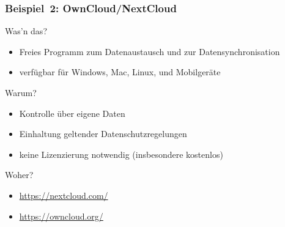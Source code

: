 \documentclass{beamer}
\begin{document}
\begin{frame}
  \frametitle{Beispiel~2: OwnCloud/NextCloud}

  \onslide<+->

  \begin{block}{Was'n das?}
    \begin{itemize}
    \item Freies Programm zum Datenaustausch und zur Datensynchronisation
    \item verfügbar für Windows, Mac, Linux, und Mobilgeräte
    \end{itemize}
  \end{block}

  \onslide<+->

  \begin{block}{Warum?}
    \begin{itemize}
    \item Kontrolle über eigene Daten
    \item Einhaltung geltender Datenschutzregelungen
    \item keine Lizenzierung notwendig (insbesondere kostenlos)
    \end{itemize}
  \end{block}

  \onslide<+->

  \begin{block}{Woher?}
    \begin{itemize}
    \item \url{https://nextcloud.com/}
    \item \url{https://owncloud.org/}
    \end{itemize}
  \end{block}


\end{frame}
\end{document}
